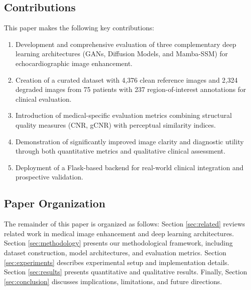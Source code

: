 \documentclass[10pt,conference,letterpaper]{IEEEtran}
\begin{document}
\subsection{Contributions}

This paper makes the following key contributions:

\begin{enumerate}
  \item Development and comprehensive evaluation of three complementary deep learning architectures (GANs, Diffusion Models, and Mamba-SSM) for echocardiographic image enhancement.
  
  \item Creation of a curated dataset with 4,376 clean reference images and 2,324 degraded images from 75 patients with 237 region-of-interest annotations for clinical evaluation.
  
  \item Introduction of medical-specific evaluation metrics combining structural quality measures (CNR, gCNR) with perceptual similarity indices.
  
  \item Demonstration of significantly improved image clarity and diagnostic utility through both quantitative metrics and qualitative clinical assessment.
  
  \item Deployment of a Flask-based backend for real-world clinical integration and prospective validation.
\end{enumerate}

\subsection{Paper Organization}

The remainder of this paper is organized as follows: Section \ref{sec:related} reviews related work in medical image enhancement and deep learning architectures. Section \ref{sec:methodology} presents our methodological framework, including dataset construction, model architectures, and evaluation metrics. Section \ref{sec:experiments} describes experimental setup and implementation details. Section \ref{sec:results} presents quantitative and qualitative results. Finally, Section \ref{sec:conclusion} discusses implications, limitations, and future directions.

\end{document}
